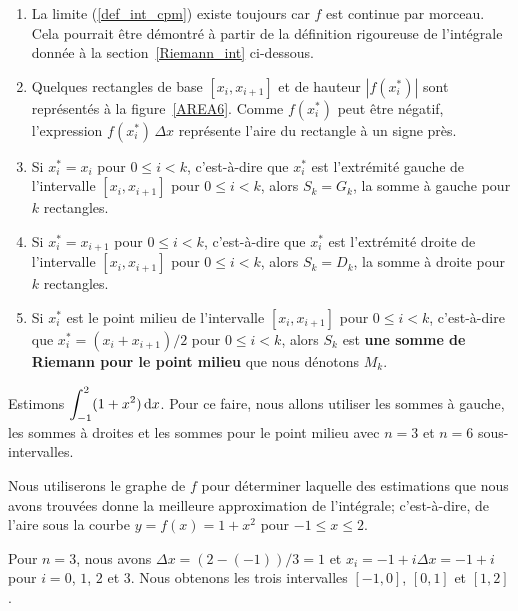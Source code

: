 {\begin{rmkList}
\begin{enumerate}
\item La limite (\ref{def_int_cpm}) existe toujours car $f$ est
  continue par morceau.  Cela pourrait être démontré à partir de la
  définition rigoureuse de l'intégrale donnée à la
  section~\ref{Riemann_int} ci-dessous.
\item Quelques rectangles de base $[x_i,x_{i+1}]$ et de hauteur
$|f(x_i^\ast)|$ sont représentés à la figure~\ref{AREA6}.  Comme
$f(x_i^\ast)$ peut être négatif, l'expression
$f(x_i^\ast)\,\Delta x$ représente l'aire du rectangle à un signe
près.
\item Si $x_i^\ast = x_i$ pour $0\leq i <k$, c'est-à-dire que
$x_i^\ast$ est l'extrémité gauche de l'intervalle $[x_i,x_{i+1}]$
pour $0\leq i <k$, alors $S_k = G_k$, la somme à gauche pour $k$
rectangles.
\item Si $x_i^\ast = x_{i+1}$ pour $0\leq i<k$, c'est-à-dire que
$x_i^\ast$ est l'extrémité droite de l'intervalle $[x_i,x_{i+1}]$ pour
$0\leq i <k$, alors $S_k = D_k$, la somme à droite pour $k$
rectangles.
\item Si $x_i^\ast$ est le point milieu de l'intervalle $[x_i, x_{i+1}]$
pour $0\leq i< k$, c'est-à-dire que $x_i^\ast = (x_i+x_{i+1})/2$ pour
$0\leq i<k$, alors $S_k$ est
{\bfseries une somme de Riemann pour le point milieu} 
 que nous dénotons $M_k$.
\end{enumerate}
\label{IDadgm}
\end{rmkList}


\begin{egg}
Estimons $\displaystyle \int_{-1}^2  (1 + x^2) \,\mathrm{d}x$.  Pour ce faire, nous
allons utiliser les sommes à gauche, les sommes à droites et les sommes
pour le point milieu avec $n=3$ et $n=6$ sous-intervalles.

Nous utiliserons le graphe de $f$ pour déterminer laquelle des
estimations que nous avons trouvées donne la meilleure approximation de
l'intégrale; c'est-à-dire, de l'aire sous la courbe $y=f(x) = 1+x^2$
pour $-1 \leq x \leq 2$.

Pour $n=3$, nous avons $\Delta x = (2-(-1))/3=1$ et
$x_i = -1 + i \Delta x = -1+i$ pour $i=0$, $1$, $2$ et $3$.
Nous obtenons les trois intervalles $[-1,0]$, $[0, 1]$ et $[1, 2]$.


\end{egg}}
